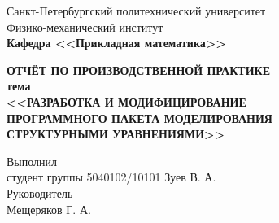 \documentclass[main.tex]{subfiles}
\begin{document}
\begin{titlepage}
\begin{center}
	\begin{large}
		Санкт-Петербургский политехнический университет\\
		Физико-механический институт\\
		\textbf{Кафедра <<Прикладная математика>>}\\
	\end{large}
	\vfill
	\large{\textbf{ОТЧЁТ ПО ПРОИЗВОДСТВЕННОЙ ПРАКТИКЕ\\
            тема \\
	<<РАЗРАБОТКА И МОДИФИЦИРОВАНИЕ\\
    ПРОГРАММНОГО ПАКЕТА МОДЕЛИРОВАНИЯ\\
    СТРУКТУРНЫМИ УРАВНЕНИЯМИ>>}} \normalsize
\end{center}
\vfill
\flushleft
Выполнил\\
студент группы 5040102/10101
\flushright
Зуев В. А.\\
\flushleft
Руководитель\\
\flushright
Мещеряков Г. А.
\flushleft
\vfill
{}
\end{titlepage}
\end{document}
